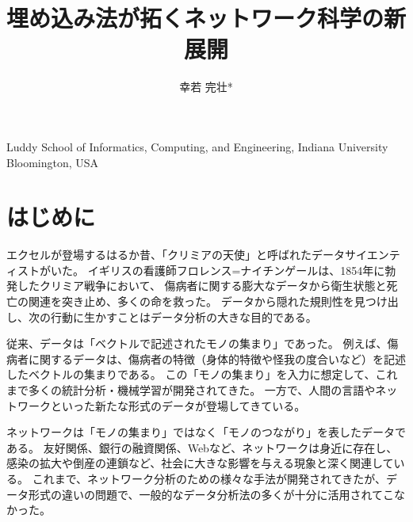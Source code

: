 \documentclass[J]{scitrans}
\begin{document}
\title{埋め込み法が拓くネットワーク科学の新展開}
\author{幸若 完壮*}


\maketitle


\address{*}{Luddy School of Informatics, Computing, and Engineering, Indiana University Bloomington, USA}



\section{はじめに}
\label{sec:introduction}


エクセルが登場するはるか昔、「クリミアの天使」と呼ばれたデータサイエンティストがいた。
イギリスの看護師フロレンス=ナイチンゲールは、1854年に勃発したクリミア戦争において、
傷病者に関する膨大なデータから衛生状態と死亡の関連を突き止め、多くの命を救った。
データから隠れた規則性を見つけ出し、次の行動に生かすことはデータ分析の大きな目的である。

従来、データは「ベクトルで記述されたモノの集まり」であった。
例えば、傷病者に関するデータは、傷病者の特徴（身体的特徴や怪我の度合いなど）を記述したベクトルの集まりである。
この「モノの集まり」を入力に想定して、これまで多くの統計分析・機械学習が開発されてきた。
一方で、人間の言語やネットワークといった新たな形式のデータが登場してきている。

ネットワークは「モノの集まり」ではなく「モノのつながり」を表したデータである。
友好関係、銀行の融資関係、Webなど、ネットワークは身近に存在し、感染の拡大や倒産の連鎖など、社会に大きな影響を与える現象と深く関連している。
これまで、ネットワーク分析のための様々な手法が開発されてきたが、データ形式の違いの問題で、一般的なデータ分析法の多くが十分に活用されてこなかった。%
\end{document}
